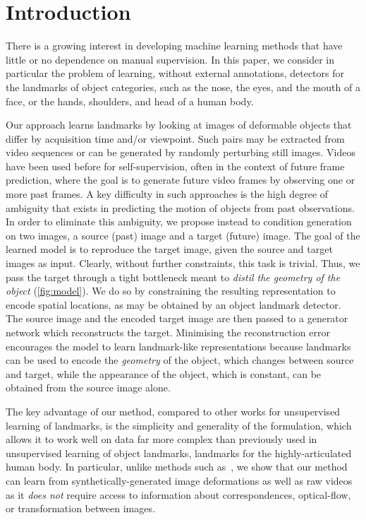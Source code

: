 \documentclass{article}
\begin{document}
\section{Introduction}\label{s:intro}

There is a growing interest in developing machine learning methods that have little or no dependence on manual supervision. In this paper, we consider in particular the problem of learning, without external annotations, detectors for the landmarks of object categories, such as the nose, the eyes, and the mouth of a face, or the hands, shoulders, and head of a human body.

Our approach learns landmarks by looking at images of deformable objects that differ by acquisition time and/or viewpoint. Such pairs may be extracted from video sequences or can be generated by randomly perturbing still images. Videos have been used before for self-supervision, often in the context of future frame prediction, where the goal is to generate future video frames by observing one or more past frames. A key difficulty in such approaches is the high degree of ambiguity that exists in predicting the motion of objects from past observations. In order to eliminate this ambiguity, we propose instead to condition generation on two images, a source (past) image and a target (future) image. The goal of the learned model is to reproduce the target image, given the source and target images as input. Clearly, without further constraints, this task is trivial. Thus, we pass the target through a tight bottleneck meant to \emph{distil the geometry of the object} (\cref{fig:model}). We do so by constraining the resulting representation to encode spatial locations, as may be obtained by an object landmark detector. The source image and the encoded target image are then passed to a generator network which reconstructs the target. Minimising the reconstruction error encourages the model to learn landmark-like representations because landmarks can be used to encode the \emph{geometry} of the object, which changes between source and target, while the appearance of the object, which is constant, can be obtained from the source image alone.

The key advantage of our method, compared to other works for unsupervised learning of landmarks, is the simplicity and generality of the formulation, which allows it to work well on data far more complex than previously used in unsupervised learning of object landmarks, \eg landmarks for the highly-articulated human body.
In particular, unlike methods such as~\cite{thewlis17unsupervised,thewlis17Bunsupervised,zhang2018unsupervised}, we show that our method can learn from synthetically-generated image deformations as well as raw videos as it \emph{does not} require access to information about correspondences, optical-flow, or transformation between images.
\end{document}
